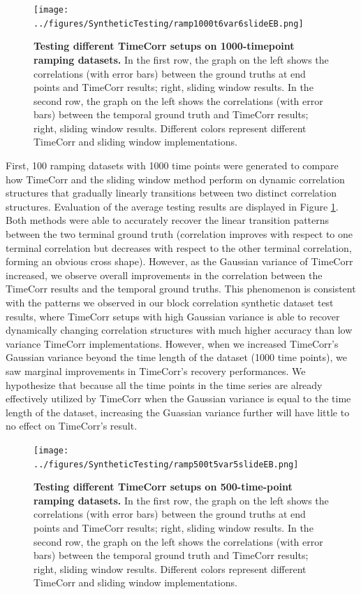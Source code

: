 \documentclass[11pt]{article}
\begin{document}
\begin{figure}[!htb]
\texttt{[image: ../figures/SyntheticTesting/ramp1000t6var6slideEB.png]}
\caption{\textbf{Testing different TimeCorr setups on 1000-timepoint ramping datasets.} In the first row, the graph on the left shows the correlations (with error bars) between the ground truths at end points and TimeCorr results; right, sliding window results. In the second row, the graph on the left shows the correlations (with error bars) between the temporal ground truth and TimeCorr results; right, sliding window results. Different colors represent different TimeCorr and sliding window implementations.}
\label{fig:ramp1000t4var}
\end{figure}

First, 100 ramping datasets with 1000 time points were generated to compare how TimeCorr and the sliding window method perform on dynamic correlation structures that gradually linearly transitions between two distinct correlation structures. Evaluation of the average testing results are displayed in Figure \ref{fig:ramp1000t4var}. Both methods were able to accurately recover the linear transition patterns between the two terminal ground truth (correlation improves with respect to one terminal correlation but decreases with respect to the other terminal correlation, forming an obvious cross shape). However, as the Gaussian variance of TimeCorr increased, we observe overall improvements in the correlation between the TimeCorr results and the temporal ground truths. This phenomenon is consistent with the patterns we observed in our block correlation synthetic dataset test results, where TimeCorr setups with high Gaussian variance is able to recover dynamically changing correlation structures with much higher accuracy than low variance TimeCorr implementations. However, when we increased TimeCorr's Gaussian variance beyond the time length of the dataset (1000 time points), we saw marginal improvements in TimeCorr's recovery performances. We hypothesize that because all the time points in the time series are already effectively utilized by TimeCorr when the Gaussian variance is equal to the time length of the dataset, increasing the Guassian variance further will have little to no effect on TimeCorr's result.


\begin{figure}[!htb]
\texttt{[image: ../figures/SyntheticTesting/ramp500t5var5slideEB.png]}
\caption{\textbf{Testing different TimeCorr setups on 500-time-point ramping datasets.} In the first row, the graph on the left shows the correlations (with error bars) between the ground truths at end points and TimeCorr results; right, sliding window results. In the second row, the graph on the left shows the correlations (with error bars) between the temporal ground truth and TimeCorr results; right, sliding window results. Different colors represent different TimeCorr and sliding window implementations.}
\label{fig:ramp500t4var}
\end{figure}
\end{document}
